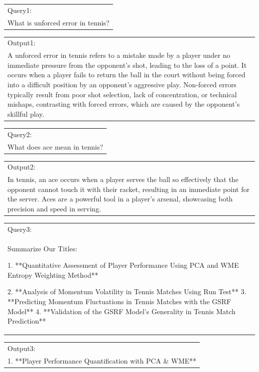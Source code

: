 \documentclass[12pt]{article}%
\begin{document}
	
	\begin{table}[!ht]
		\centering
		\begin{tabular}{|p{17cm}|}
			\hline 	    \rowcolor{black!8}
			Query1:\\ \rowcolor{black!8}
			What is unforced error in tennis? \\
			\hline
		\end{tabular}
		\begin{tabular}{|p{17cm}|}
			Output1:\\
			A unforced error in tennis refers to a mistake made by a player under no immediate pressure from the opponent's shot, leading to the loss of a point. It occurs when a player fails to return the ball in the court without being forced into a difficult position by an opponent's aggressive play. Non-forced errors typically result from poor shot selection, lack of concentration, or technical mishaps, contrasting with forced errors, which are caused by the opponent's skillful play.
			\\
			\hline
		\end{tabular}
		\begin{tabular}{|p{17cm}|}
			\hline  \rowcolor{black!8}
			Query2:\\  \rowcolor{black!8}
			What does ace mean in tennis? \\
			\hline
		\end{tabular}
		\begin{tabular}{|p{17cm}|}
			Output2:\\
			In tennis, an ace occurs when a player serves the ball so effectively that the opponent cannot touch it with their racket, resulting in an immediate point for the server. Aces are a powerful tool in a player's arsenal, showcasing both precision and speed in serving.
			\\
			\hline
		\end{tabular}
		\begin{tabular}{|p{17cm}|}
			\hline  \rowcolor{black!8}
			Query3:\\  \rowcolor{black!8}
			Summarize Our Titles:
			
			1. **Quantitative Assessment of Player Performance Using PCA and WME Entropy Weighting Method**
			
			2. **Analysis of Momentum Volatility in Tennis Matches Using Run Test**
			3. **Predicting Momentum Fluctuations in Tennis Matches with the GSRF Model**
			4. **Validation of the GSRF Model's Generality in Tennis Match Prediction** \\
			\hline
		\end{tabular}
		\begin{tabular}{|p{17cm}|}
			Output3:\\
			1. **Player Performance Quantification with PCA \& WME**
			

\end{tabular}
\end{table}
\end{document}
